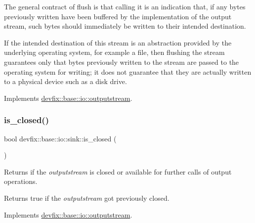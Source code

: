 The general contract of flush is that calling it is an indication that, if any bytes previously written have been buffered by the implementation of the output stream, such bytes should immediately be written to their intended destination.

If the intended destination of this stream is an abstraction provided by the underlying operating system, for example a file, then flushing the stream guarantees only that bytes previously written to the stream are passed to the operating system for writing; it does not guarantee that they are actually written to a physical device such as a disk drive. 

Implements \hyperlink{structdevfix_1_1base_1_1io_1_1outputstream_a3fe3b34675a2d70331e6ca235388e0cc}{devfix\+::base\+::io\+::outputstream}.

\mbox{\label{structdevfix_1_1base_1_1io_1_1sink_a1e5782219f9256d8ff09385fa6f3b156}} 
\subsubsection{\texorpdfstring{is\+\_\+closed()}{is\_closed()}}
{\footnotesize\ttfamily bool devfix\+::base\+::io\+::sink\+::is\+\_\+closed (\begin{DoxyParamCaption}{ }\end{DoxyParamCaption})\hspace{0.3cm}{\ttfamily [virtual]}}



Returns if the {\itshape outputstream} is closed or available for further calls of output operations. 

\begin{DoxyReturn}{Returns}
true if the {\itshape outputstream} got previously closed. 
\end{DoxyReturn}


Implements \hyperlink{structdevfix_1_1base_1_1io_1_1outputstream_a52bd2eac8f6fbc496eab5138a48d2f06}{devfix\+::base\+::io\+::outputstream}.

\mbox{\label{structdevfix_1_1base_1_1io_1_1sink_a6eade9933d316139e952b7a442f3c56d}} 
